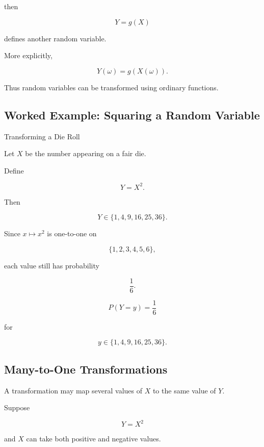 then

\[
\boxed{
Y=g(X)
}
\]

defines another random variable.

More explicitly,

\[
Y(\omega)
=
g(X(\omega)).
\]

Thus random variables can be transformed using ordinary functions.

\subsection{Worked Example: Squaring a Random Variable}
\label{subsec:worked-square-random-variable}

\begin{workedexamplebox}{Transforming a Die Roll}

Let \(X\) be the number appearing on a fair die.

Define

\[
Y=X^2.
\]

Then

\[
Y
\in
\{1,4,9,16,25,36\}.
\]

Since \(x\mapsto x^2\) is one-to-one on

\[
\{1,2,3,4,5,6\},
\]

each value still has probability

\[
\frac16.
\]

\begin{answerbox}
\[
\boxed{
P(Y=y)=\frac16
}
\]

for

\[
y\in\{1,4,9,16,25,36\}.
\]
\end{answerbox}

\end{workedexamplebox}

\subsection{Many-to-One Transformations}
\label{subsec:many-to-one-transformations}

A transformation may map several values of \(X\) to the same value of
\(Y\).

Suppose

\[
Y=X^2
\]

and \(X\) can take both positive and negative values.

